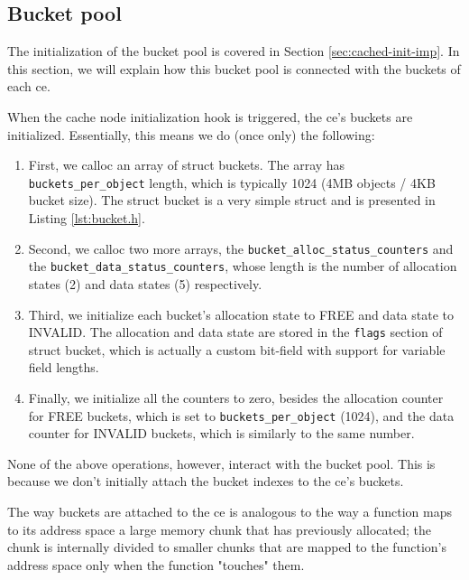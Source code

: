 \subsection{Bucket pool}\label{sec:cached-bucket-imp}

The initialization of the bucket pool is covered in Section 
\ref{sec:cached-init-imp}. In this section, we will explain how this bucket 
pool is connected with the buckets of each ce.

When the cache node initialization hook is triggered, the ce's buckets are 
initialized. Essentially, this means we do (once only) the following:

\begin{enumerate}
	\item First, we calloc an array of struct buckets. The array has
		\texttt{buckets\_per\_object} length, which is typically 1024 
		(4MB objects / 4KB bucket size). The struct bucket is a very 
		simple struct and is presented in Listing 
		\ref{lst:bucket.h}.
		

	\item Second, we calloc two more arrays, the  
		\texttt{bucket\_alloc\_status\_counters} and the
		\texttt{bucket\_data\_status\_counters}, whose length is the 
		number of allocation states (2) and data states (5) 
		respectively.
	\item Third, we initialize each bucket's allocation state to FREE and 
		data state to INVALID. The allocation and data state are stored 
		in the \texttt{flags} section of struct bucket, which is 
		actually a custom bit-field with support for variable field 
		lengths.
	\item Finally, we initialize all the counters to zero, besides the 
		allocation counter for FREE buckets, which is set to 
		\texttt{buckets\_per\_object} (1024), and the data counter for 
		INVALID buckets, which is similarly to the same number.
\end{enumerate}

None of the above operations, however, interact with the bucket pool. This is 
because we don't initially attach the bucket indexes to the ce's buckets.

The way buckets are attached to the ce is analogous to the way a function maps 
to its address space a large memory chunk that has previously allocated; the 
chunk is internally divided to smaller chunks that are mapped to the function's 
address space only when the function "touches" them.

